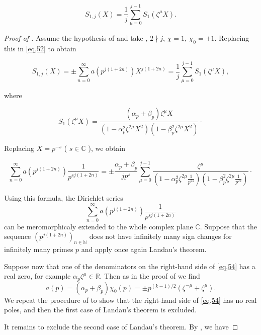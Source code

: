 \documentclass[smallcondensed]{svjour3}
\begin{document}
\begin{equation}
S_{1,j}(X)=\frac{1}{j}\sum_{\mu =0}^{j-1}S_{1}(\zeta^{\mu}X).\label{eq,51}
\end{equation}

\begin{proof}[Proof of ]

Assume the hypothesis of  and take , $2\nmid j$, $\chi=1$, $\chi_{0}=\pm 1$. Replacing this in \eqref{eq,52} to obtain

\begin{equation}
S_{1,j}(X)=\pm \sum_{n=0}^{\infty}a(p^{j(1+2 n)})X^{j(1+2 n)}=\frac{1}{j}\sum_{\mu =0}^{j-1}S_{1}(\zeta^{\mu}X),\label{eq,53}
\end{equation}

where

\begin{equation}
S_{1}(\zeta^{\mu} X)=\frac{(\alpha_{p}+\beta_{p})\zeta^{\mu}X}{(1-\alpha_{p}^{2}\zeta^{2\mu}X^{2})(1-\beta_{p}^{2}\zeta^{2\mu}X^{2})}\cdot
\end{equation}

Replacing $X=p^{-s}$ ( $s\in{\mathbb C}$ ), we obtain

\begin{equation}
\sum_{n=0}^{\infty}a(p^{j(1+2 n)})\frac{1}{p^{s j(1+2 n)}}=\pm \frac{\alpha_{p}+\beta_{p}}{j p^{s}}\sum_{\mu =0}^{j-1}\frac{\zeta^{\mu}}{(1-\alpha_{p}^{2}\zeta^{2\mu}\frac{1}{p^{2 s}})(1-\beta_{p}^{2}\zeta^{2\mu}\frac{1}{p^{2 s}})}\label{eq,54}\cdot
\end{equation}

Using this formula, the Dirichlet series 
$$
\sum_{n=0}^{\infty}a(p^{j(1+2 n)})\frac{1}{p^{s j(1+2 n)}}
$$ 
can be meromorphicaly extended to the whole complex plane $\mathbb{C}$. Suppose that the sequence $(p^{j(1+2 n)})_{n\in\mathbb{N}}$ does not have infinitely many sign changes for infinitely many primes $p$ and apply once again Landau's theorem.

Suppose now that one of the denominators on the right-hand side of \eqref{eq,54} has a real zero, for example $\alpha_{p}\zeta^{\mu}\in{\mathbb R}$. Then as in the proof of  we find
$$
a(p)=(\alpha_p+\beta_p)\chi_{0}(p)=\pm p^{(k-1)/2}(\zeta^{-\mu}+\zeta^{\mu}).
$$
We repeat the procedure of  to show that the right-hand side of \eqref{eq,54} has no real poles, and then the first case of Landau's theorem is excluded.   

It remains to exclude the second case of Landau's theorem. By , we have  


\end{proof}
\end{document}
